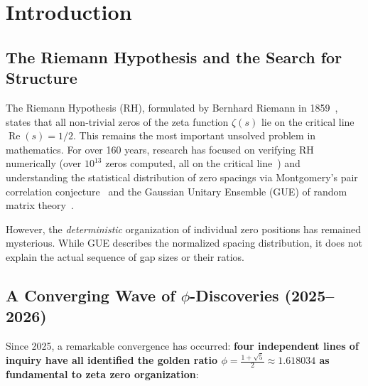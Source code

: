 \documentclass[11pt,a4paper]{article}
\DeclareMathOperator{\Rea}{Re}
\begin{document}
\section{Introduction}

\subsection{The Riemann Hypothesis and the Search for Structure}

The Riemann Hypothesis (RH), formulated by Bernhard Riemann in 1859~\cite{riemann1859}, states that all non-trivial zeros of the zeta function $\zeta(s)$ lie on the critical line $\Rea(s) = 1/2$. This remains the most important unsolved problem in mathematics. For over 160 years, research has focused on verifying RH numerically (over $10^{13}$ zeros computed, all on the critical line~\cite{gourdon2004}) and understanding the statistical distribution of zero spacings via Montgomery's pair correlation conjecture~\cite{montgomery1973} and the Gaussian Unitary Ensemble (GUE) of random matrix theory~\cite{odlyzko1987}.

However, the \emph{deterministic} organization of individual zero positions has remained mysterious. While GUE describes the normalized spacing distribution, it does not explain the actual sequence of gap sizes or their ratios.

\subsection{A Converging Wave of $\phi$-Discoveries (2025--2026)}

Since 2025, a remarkable convergence has occurred: \textbf{four independent lines of inquiry have all identified the golden ratio $\phi = \frac{1+\sqrt{5}}{2} \approx 1.618034$ as fundamental to zeta zero organization}:
\end{document}
